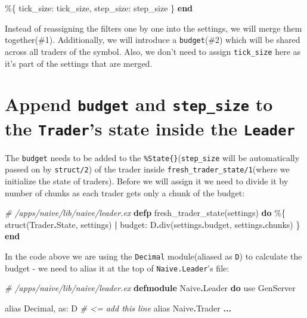 \documentclass[
  oneside]{book}
\newenvironment{Shaded}{\begin{snugshade}}{\end{snugshade}}
\newcommand{\CommentTok}[1]{\textcolor[rgb]{0.56,0.35,0.01}{\textit{#1}}}
\newcommand{\ConstantTok}[1]{\textcolor[rgb]{0.00,0.00,0.00}{#1}}
\newcommand{\ImportTok}[1]{#1}
\newcommand{\KeywordTok}[1]{\textcolor[rgb]{0.13,0.29,0.53}{\textbf{#1}}}
\newcommand{\NormalTok}[1]{#1}
\newcommand{\OperatorTok}[1]{\textcolor[rgb]{0.81,0.36,0.00}{\textbf{#1}}}
\newcommand{\VariableTok}[1]{\textcolor[rgb]{0.00,0.00,0.00}{#1}}
\begin{document}
\begin{Shaded}
\begin{Highlighting}[]
\NormalTok{    \%\{}
      \VariableTok{tick\_size:}\NormalTok{ tick\_size,}
      \VariableTok{step\_size:}\NormalTok{ step\_size}
\NormalTok{    \}}
  \KeywordTok{end}
\end{Highlighting}
\end{Shaded}

Instead of reassigning the filters one by one into the settings, we will merge them together(\#1). Additionally, we will introduce a \texttt{budget}(\#2) which will be shared across all traders of the symbol. Also, we don't need to assign \texttt{tick\_size} here as it's part of the settings that are merged.

\hypertarget{append-budget-and-step_size-to-the-traders-state-inside-the-leader}{%
\section{\texorpdfstring{Append \texttt{budget} and \texttt{step\_size} to the \texttt{Trader}'s state inside the \texttt{Leader}}{Append budget and step\_size to the Trader's state inside the Leader}}\label{append-budget-and-step_size-to-the-traders-state-inside-the-leader}}

The \texttt{budget} needs to be added to the \texttt{\%State\{\}}(\texttt{step\_size} will be automatically passed on by \texttt{struct/2}) of the trader inside \texttt{fresh\_trader\_state/1}(where we initialize the state of traders). Before we will assign it we need to divide it by number of chunks as each trader gets only a chunk of the budget:

\begin{Shaded}
\begin{Highlighting}[]
  \CommentTok{\# /apps/naive/lib/naive/leader.ex}
  \KeywordTok{defp}\NormalTok{ fresh\_trader\_state(settings) }\KeywordTok{do}
\NormalTok{    \%\{}
\NormalTok{      struct(}\ConstantTok{Trader}\OperatorTok{.}\ConstantTok{State}\NormalTok{, settings) }\OperatorTok{|}
      \VariableTok{budget:}\NormalTok{ D}\OperatorTok{.}\NormalTok{div(settings}\OperatorTok{.}\NormalTok{budget, settings}\OperatorTok{.}\NormalTok{chunks)}
\NormalTok{    \}}
  \KeywordTok{end}
\end{Highlighting}
\end{Shaded}

In the code above we are using the \texttt{Decimal} module(aliased as \texttt{D}) to calculate the budget - we need to alias it at the top of \texttt{Naive.Leader}'s file:

\begin{Shaded}
\begin{Highlighting}[]
\CommentTok{\# /apps/naive/lib/naive/leader.ex}
\KeywordTok{defmodule} \ConstantTok{Naive}\OperatorTok{.}\ConstantTok{Leader} \KeywordTok{do}
  \ImportTok{use} \ConstantTok{GenServer}

  \ImportTok{alias} \ConstantTok{Decimal}\NormalTok{, }\VariableTok{as:}\NormalTok{ D }\CommentTok{\# \textless{}= add this line}
  \ImportTok{alias} \ConstantTok{Naive}\OperatorTok{.}\ConstantTok{Trader}
  \OperatorTok{...}
\end{Highlighting}
\end{Shaded}
\end{document}
